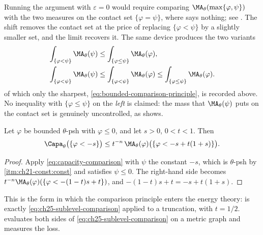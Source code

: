 \begin{remark}
\label{rem:ch25-comparison-shift}
Running the argument with \(\varepsilon=0\) would require comparing
\(\MA_\theta(\max\{\varphi,\psi\})\) with the two measures on the contact set
\(\{\varphi=\psi\}\), where  says
nothing; see .  The shift removes the contact set at
the price of replacing \(\{\varphi<\psi\}\) by a slightly smaller set, and
the limit recovers it.  The same device produces the two variants
\[
 \begin{aligned}
 \int_{\{\varphi<\psi\}}\MA_\theta(\psi)
 &\leq\int_{\{\varphi\leq\psi\}}\MA_\theta(\varphi),\\
 \int_{\{\varphi<\psi\}}\MA_\theta(\psi)
 &\leq\int_{\{\varphi<\psi\}}\MA_\theta(\varphi)
 \leq\int_{\{\varphi\leq\psi\}}\MA_\theta(\varphi).
 \end{aligned}
\]
of which only the sharpest,
\eqref{eq:bounded-comparison-principle}, is recorded above.  No inequality
with \(\{\varphi\leq\psi\}\) on the \emph{left} is claimed: the mass that
\(\MA_\theta(\psi)\) puts on the contact set is genuinely uncontrolled, as
 shows.
\end{remark}

\begin{corollary}
\label{cor:ch25-sublevel-comparison}
Let \(\varphi\) be bounded \(\theta\)-psh with \(\varphi\leq0\), and let
\(s>0\), \(0<t<1\).  Then
\begin{equation}
\label{eq:ch25-sublevel-comparison}
 \Capa_\theta\bigl(\{\varphi<-s\}\bigr)
 \leq t^{-n}\,\MA_\theta(\varphi)
   \bigl(\{\varphi<-s+t(1+s)\}\bigr).
\end{equation}
\end{corollary}

\begin{proof}
Apply \eqref{eq:capacity-comparison} with \(\psi\) the constant \(-s\), which
is \(\theta\)-psh by
\,\cref{itm:ch21-const:const} and satisfies
\(\psi\leq0\).  The right-hand side becomes
\(t^{-n}\MA_\theta(\varphi)(\{\varphi<-(1-t)s+t\})\), and
\(-(1-t)s+t=-s+t(1+s)\).
\end{proof}

This is the form in which the comparison principle enters the energy theory:
 is exactly
\eqref{eq:ch25-sublevel-comparison} applied to a truncation, with
\(t=1/2\).   evaluates both sides of
\eqref{eq:ch25-sublevel-comparison} on a metric graph and measures the loss.

